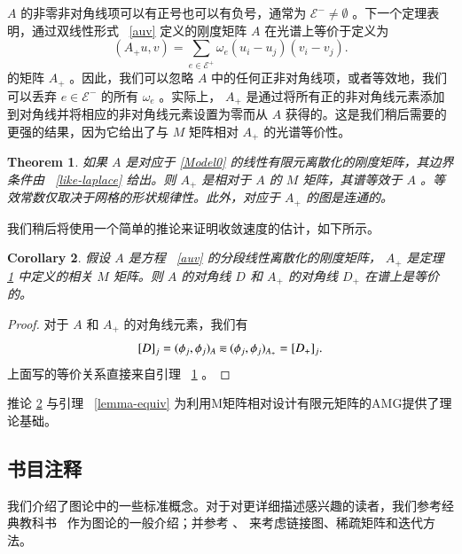 \documentclass[12pt]{acta_2011xz}
\newcommand{\eqqsim}{\mathbin{\rotatebox[origin=c]{180}{\ensuremath{\cong}}}}
\newtheorem{theorem}{Theorem}[section]
\newtheorem{corollary}[theorem]{Corollary}
\begin{document}
   $A$    的非零非对角线项可以有正号也可以有负号，通常为    $\mathcal{E}^-\neq \emptyset$    。下一个定理表明，通过双线性形式~    \eqref{auv}    定义的刚度矩阵    $A$    在光谱上等价于定义为
   \begin{equation}\label{diag-compensate}
(A_+ u,v) = \sum_{e\in \mathcal{E}^+} \omega_e (u_i-u_j)(v_i-v_j). 
\end{equation}    的矩阵    $A_+$    。因此，我们可以忽略    $A$    中的任何正非对角线项，或者等效地，我们可以丢弃    $e\in \mathcal{E}^-$    的所有    $\omega_e$    。实际上，   $A_+$    是通过将所有正的非对角线元素添加到对角线并将相应的非对角线元素设置为零而从    $A$    获得的。这是我们稍后需要的更强的结果，因为它给出了与    $M$    矩阵相对    $A_+$    的光谱等价性。
   \begin{theorem}   \label{m-matrix-plus}    如果    $A$    是对应于    \eqref{Model0}    的线性有限元离散化的刚度矩阵，其边界条件由~    \eqref{like-laplace}    给出。则    $A_+$    是相对于    $A$    的    $M$    矩阵，其谱等效于    $A$    。等效常数仅取决于网格的形状规律性。此外，对应于    $A_+$    的图是连通的。  \end{theorem}     

我们稍后将使用一个简单的推论来证明收敛速度的估计，如下所示。
   \begin{corollary}   \label{corollary-diag}    假设    $A$    是方程~    \eqref{auv}    的分段线性离散化的刚度矩阵，   $A_+$    是定理~    \ref{m-matrix-plus}    中定义的相关    $M$    矩阵。则    $A$    的对角线    $D$    和    $A_+$    的对角线    $D_+$    在谱上是等价的。  \end{corollary}   
   \begin{proof}对于    $A$    和    $A_+$    的对角线元素，我们有
   \[
[D]_j = (\phi_j,\phi_j)_A \eqqsim (\phi_j,\phi_j)_{A_+} =[D_+]_j.
\]    上面写的等价关系直接来自引理~    \ref{m-matrix-plus}    。  \end{proof}     

推论   \ref{corollary-diag}   与引理~   \ref{lemma-equiv}   为利用M矩阵相对设计有限元矩阵的AMG提供了理论基础。  

   \subsection{书目注释  }    我们介绍了图论中的一些标准概念。对于对更详细描述感兴趣的读者，我们参考经典教科书~    \cite{2010DiestelR-aa,1985GibbonsA-aa}    作为图论的一般介绍；并参考    \cite{2003SaadY-aa}    、
   \cite{2000VargaR-aa}    来考虑链接图、稀疏矩阵和迭代方法。  
\end{document}
